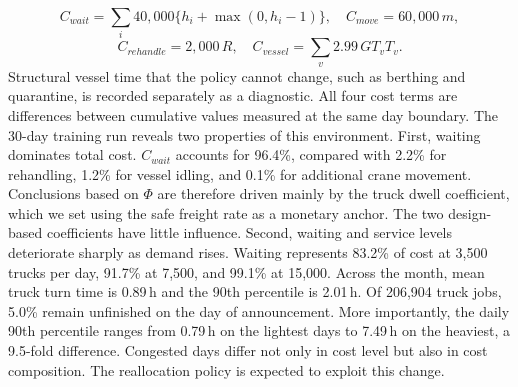 \begin{equation}
C_{wait}=\sum_i 40{,}000\{h_i+\max(0,h_i-1)\},\quad
C_{move}=60{,}000\,m,
\end{equation}
\begin{equation}
C_{rehandle}=2{,}000\,R,\quad C_{vessel}=\sum_v 2.99\,GT_v T_v.
\end{equation}
Structural vessel time that the policy cannot change, such as berthing
and quarantine, is recorded separately as a diagnostic. All four cost
terms are differences between cumulative values measured at the same day
boundary.
The 30-day training run reveals two properties of this environment.
First, waiting dominates total cost. $C_{wait}$ accounts for 96.4\%,
compared with 2.2\% for rehandling, 1.2\% for vessel idling, and 0.1\%
for additional crane movement. Conclusions based on $\Phi$ are therefore
driven mainly by the truck dwell coefficient, which we set using the
safe freight rate as a monetary anchor. The two design-based coefficients have little influence.
Second, waiting and service levels deteriorate sharply as demand rises.
Waiting represents 83.2\% of cost at 3{,}500 trucks per day, 91.7\% at
7{,}500, and 99.1\% at 15{,}000. Across the month, mean truck turn time
is 0.89\,h and the 90th percentile is 2.01\,h. Of 206{,}904 truck jobs,
5.0\% remain unfinished on the day of announcement. More importantly,
the daily 90th percentile ranges from 0.79\,h on the lightest days to
7.49\,h on the heaviest, a 9.5-fold difference. Congested days differ
not only in cost level but also in cost composition. The reallocation
policy is expected to exploit this change.
